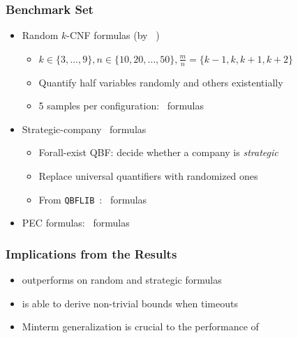 \begin{frame}
    \frametitle{Benchmark Set}
    \begin{itemize}
        \item Random $k$-CNF formulas (by \cnfgen~\cite{Lauria2017CNFgen})
              \begin{itemize}
                  \item $k\in\{3,\ldots,9\},n\in\{10,20,\ldots,50\},\frac{m}{n}=\{k-1,k,k+1,k+2\}$
                  \item Quantify half variables randomly and others existentially
                  \item \num{5} samples per configuration: \nrandom~formulas
              \end{itemize}
              \pause
        \item Strategic-company~\cite{Cadoli1997} formulas
              \begin{itemize}
                  \item Forall-exist QBF: decide whether a company is \textit{strategic}
                  \item Replace universal quantifiers with randomized ones
                  \item From \texttt{QBFLIB}~\cite{Narizzano2006}: \nstrategic~formulas
              \end{itemize}
              \pause
        \item PEC formulas: \npec~formulas
    \end{itemize}
\end{frame}

\begin{frame}
    \frametitle{Implications from the Results}
    \begin{itemize}
        \item \ressat outperforms \dcssat on random and strategic formulas
              \pause
        \item \ressat is able to derive non-trivial bounds when \dcssat timeouts
              \pause
        \item Minterm generalization is crucial to the performance of \ressat
    \end{itemize}
\end{frame}

